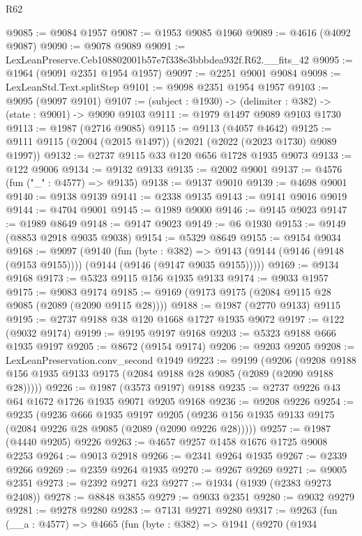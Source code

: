 \begin{lexlean}{R62}
\begin{coremodule}
@9085 := @9084 @1957
@9087 := @1953 @9085 @1960
@9089 := @4616 (@4092 @9087)
@9090 := @9078 @9089
@9091 := LexLeanPreserve.Ceb108802001b57e7f338e3bbbdea932f.R62.__fits_42
@9095 := @1964 (@9091 @2351 @1954 @1957)
@9097 := @2251 @9001 @9084
@9098 := LexLeanStd.Text.splitStep
@9101 := @9098 @2351 @1954 @1957
@9103 := @9095 (@9097 @9101)
@9107 := (subject : @1930) -> (delimiter : @382) -> (state : @9001) -> @9090 @9103
@9111 := @1979 @1497 @9089 @9103 @1730
@9113 := @1987 (@2716 @9085)
@9115 := @9113 (@4057 @4642)
@9125 := @9111 @9115 (@2004 (@2015 @1497)) (@2021 (@2022 (@2023 @1730) @9089 @1997))
@9132 := @2737 @9115 @33 @120 @656 @1728 @1935 @9073
@9133 := @122 @9006
@9134 := @9132 @9133
@9135 := @2002 @9001
@9137 := @4576 (fun ("_" : @4577) => @9135)
@9138 := @9137 @9010
@9139 := @4698 @9001
@9140 := @9138 @9139
@9141 := @2338 @9135
@9143 := @9141 @9016 @9019
@9144 := @4704 @9001
@9145 := @1989 @9000
@9146 := @9145 @9023
@9147 := @1989 @8649
@9148 := @9147 @9023
@9149 := @6 @1930
@9153 := @9149 (@8853 @2918 @9035 @9038)
@9154 := @5329 @8649
@9155 := @9154 @9034
@9168 := @9097
    (@9140
      (fun (byte : @382) =>
      @9143 (@9144 (@9146 (@9148 (@9153 @9155)))) (@9144 (@9146 (@9147 @9035 @9155)))))
@9169 := @9134 @9168
@9173 := @5323 @9115 @156 @1935 @9133
@9174 := @9033 @1957
@9175 := @9083 @9174
@9185 := @9169 (@9173 @9175 (@2084 @9115 @28 @9085 (@2089 (@2090 @9115 @28))))
@9188 := @1987 (@2770 @9133) @9115
@9195 := @2737 @9188 @38 @120 @1668 @1727 @1935 @9072
@9197 := @122 (@9032 @9174)
@9199 := @9195 @9197 @9168
@9203 := @5323 @9188 @666 @1935 @9197
@9205 := @8672 (@9154 @9174)
@9206 := @9203 @9205
@9208 := LexLeanPreservation.conv_second @1949
@9223 := @9199
    (@9206 (@9208 @9188 @156 @1935 @9133 @9175 (@2084 @9188 @28 @9085 (@2089 (@2090 @9188 @28)))))
@9226 := @1987 (@3573 @9197) @9188
@9235 := @2737 @9226 @43 @64 @1672 @1726 @1935 @9071 @9205 @9168
@9236 := @9208 @9226
@9254 := @9235
    (@9236
      @666
      @1935
      @9197
      @9205
      (@9236 @156 @1935 @9133 @9175 (@2084 @9226 @28 @9085 (@2089 (@2090 @9226 @28)))))
@9257 := @1987 (@4440 @9205) @9226
@9263 := @4657 @9257 @1458 @1676 @1725 @9008 @2253
@9264 := @9013 @2918
@9266 := @2341 @9264 @1935
@9267 := @2339 @9266
@9269 := @2359 @9264 @1935
@9270 := @9267 @9269
@9271 := @9005 @2351
@9273 := @2392 @9271 @23
@9277 := @1934 (@1939 (@2383 @9273 @2408))
@9278 := @8848 @3855
@9279 := @9033 @2351
@9280 := @9032 @9279
@9281 := @9278 @9280
@9283 := @7131 @9271 @9280
@9317 := @9263
    (fun (__a : @4577) =>
    @4665
      (fun (byte : @382) =>
      @1941
        (@9270
          (@1934

\end{coremodule}
\end{lexlean}
